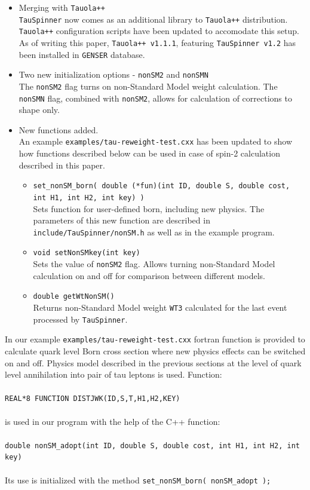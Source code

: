 \documentclass[12pt]{article}
\begin{document}
\begin{itemize}
\item Merging with {\tt Tauola++} \\
      {\tt TauSpinner} now comes as an additional library to {\tt Tauola++}
      distribution. {\tt Tauola++} configuration scripts have been updated
      to accomodate this setup. As of writing this paper, {\tt Tauola++ v1.1.1},
      featuring {\tt TauSpinner v1.2} has been installed in
      {\tt GENSER}\cite{LCG,Kirsanov:2008zz} database.
\item Two new initialization options - {\tt nonSM2} and {\tt nonSMN} \\
      The {\tt nonSM2} flag turns on non-Standard Model weight calculation.
      The {\tt nonSMN} flag, combined with {\tt nonSM2}, allows for calculation
      of corrections to shape only.
\item New functions added. \\
      An example {\tt examples/tau-reweight-test.cxx} has been updated to show
      how functions described below can be used in case of spin-2 calculation
       described in this paper.
      \begin{itemize}
      \item {\tt set\_nonSM\_born( double (*fun)(int ID, double S, double cost, int H1, int H2, int key) ) } \\
            Sets function for user-defined born, including new physics.
            The parameters of this new function are described in {\tt include/TauSpinner/nonSM.h}
            as well as in the example program.
      \item {\tt void setNonSMkey(int key)} \\
            Sets the value of {\tt nonSM2} flag. Allows turning non-Standard Model
            calculation on and off for comparison between different models.
      \item {\tt double getWtNonSM()} \\
            Returns non-Standard Model weight {\tt WT3} calculated for the last event
            processed by {\tt TauSpinner}.
      \end{itemize}
\end{itemize}

In our example {\tt examples/tau-reweight-test.cxx} fortran function is provided to calculate 
quark level Born cross section where new physics effects can be switched on and off.
Physics model described in the previous sections
at the level of quark level annihilation into pair of tau leptons is used. Function: \\
\\
{\tt REAL*8 FUNCTION DISTJWK(ID,S,T,H1,H2,KEY)} \\
\\
is used in our program with the help of the C++ function: \\
\\
{\tt  double nonSM{\_}adopt(int ID, double S, double cost, int H1, int H2, int key)} \\
\\
Its use is initialized with the method 
{\tt set{\_}nonSM{\_}born( nonSM{\_}adopt ); }
\end{document}

